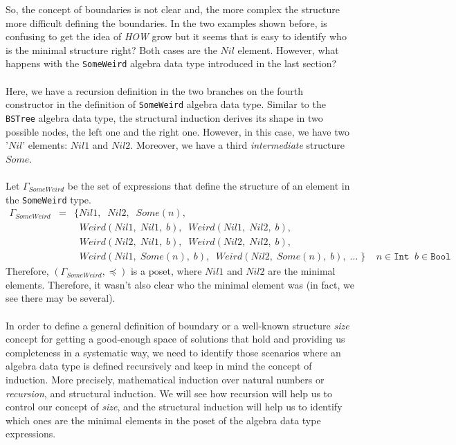 \documentclass{report}
\theoremstyle{definition}
\theoremstyle{definition}
\newcommand{\ttt}[1]{\texttt{#1}}
\newcommand{\tav}{\;\;}
\begin{document}
So, the concept of boundaries is not clear and, the more complex the structure more difficult defining the boundaries. In the two examples shown before, is confusing to get the idea of \textit{HOW} grow but it seems that is easy to identify who is the minimal structure right? Both cases are the $Nil$ element. However, what happens with the \ttt{SomeWeird} algebra data type introduced in the last section?\\\\
Here, we have a recursion definition in the two branches on the fourth constructor in the definition of \ttt{SomeWeird} algebra data type. Similar to the \ttt{BSTree} algebra data type, the structural induction derives its shape in two possible nodes, the left one and the right one. However, in this case, we have two '$Nil$' elements: $Nil1$ and $Nil2$. Moreover, we have a third \textit{intermediate} structure $Some$.\\\\
Let $\Gamma_{SomeWeird}$ be the set of expressions that define the structure of an element in the \ttt{SomeWeird} type.
\begin{eqnarray*}
	\Gamma_{SomeWeird} & = & \{ Nil1, \tav Nil2, \tav Some(n), \\
	&& \tav Weird(Nil1, \; Nil1, \; b), \tav Weird(Nil1, \; Nil2, \; b), \\
	&& \tav Weird(Nil2, \; Nil1, \; b), \tav Weird(Nil2, \; Nil2, \; b),  \\
	&& \tav Weird(Nil1, \; Some(n), \; b), \tav Weird(Nil2, \; Some(n), \; b), \; \ldots \; \} \tav \tav n \in \ttt{Int} \tav b \in \ttt{Bool}
\end{eqnarray*}
Therefore, $(\Gamma_{SomeWeird}, \preceq)$ is a poset, where $Nil1$ and $Nil2$ are the minimal elements. Therefore, it wasn't also clear who the minimal element was (in fact, we see there may be several).\\\\
In order to define a general definition of boundary or a well-known structure \textit{size} concept for getting a good-enough space of solutions that hold and providing us completeness in a systematic way, we need to identify those scenarios where an algebra data type is defined recursively and keep in mind the concept of induction. More precisely, mathematical induction over natural numbers or \textit{recursion}, and structural induction. We will see how recursion will help us to control our concept of \textit{size}, and the structural induction will help us to identify which ones are the minimal elements in the poset of the algebra data type expressions.\\
\end{document}
